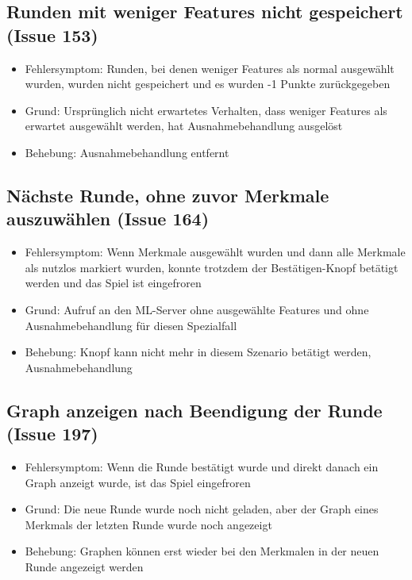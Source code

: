 \documentclass[a4paper]{scrreprt}
\begin{document}
    \subsection{Runden mit weniger Features nicht gespeichert (Issue 153)}
    \begin{itemize}
    \item Fehlersymptom: Runden, bei denen weniger Features als normal ausgewählt
     wurden, wurden nicht gespeichert und es wurden -1 Punkte zurückgegeben
    \item Grund: Ursprünglich nicht erwartetes Verhalten, dass weniger Features
     als erwartet ausgewählt werden, hat Ausnahmebehandlung ausgelöst
    \item Behebung: Ausnahmebehandlung entfernt
    \end{itemize}

    \subsection{Nächste Runde, ohne zuvor Merkmale auszuwählen (Issue 164)}
    \begin{itemize}
    \item Fehlersymptom: Wenn Merkmale ausgewählt wurden und dann alle Merkmale
     als nutzlos markiert wurden, konnte trotzdem der Bestätigen-Knopf betätigt
     werden und das Spiel ist eingefroren
    \item Grund: Aufruf an den ML-Server ohne ausgewählte Features und ohne
     Ausnahmebehandlung für diesen Spezialfall
    \item Behebung: Knopf kann nicht mehr in diesem Szenario betätigt werden, Ausnahmebehandlung
    \end{itemize}

    \subsection{Graph anzeigen nach Beendigung der Runde (Issue 197)}
    \begin{itemize}
        \item Fehlersymptom: Wenn die Runde bestätigt wurde und direkt danach ein Graph anzeigt wurde, ist das Spiel eingefroren
        \item Grund: Die neue Runde wurde noch nicht geladen, aber der Graph eines Merkmals der letzten Runde wurde noch angezeigt
        \item Behebung: Graphen können erst wieder bei den Merkmalen in der neuen Runde angezeigt werden
    \end{itemize}
\end{document}
